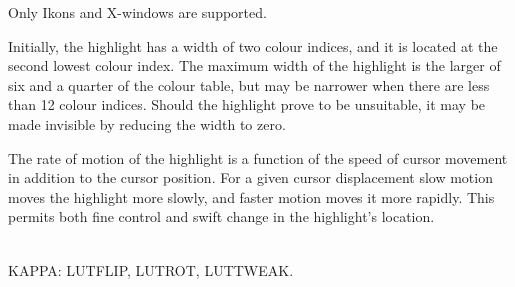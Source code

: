 \documentclass[twoside,11pt]{article}
\newcommand{\sstdiytopic}[2]{\goodbreak \item[{\hspace{-0.35em}#1\hspace{-0.35em}:}] \mbox{} \\[1.3ex] #2}
\newcommand{\sstitem}{\item}
\newcommand{\sstdiytopic}[2]{\item[{#1}]
      \begin{description}
         #2
      \end{description}
   }
\begin{document}
{{{         \sstitem
         Only Ikons and X-windows are supported.

         \sstitem
         Initially, the highlight has a width of two colour indices,
         and it is located at the second lowest colour index.  The maximum
         width of the highlight is the larger of six and a quarter of the
         colour table, but may be narrower when there are less than 12
         colour indices.  Should the highlight prove to be unsuitable, it
         may be made invisible by reducing the width to zero.

         \sstitem
         The rate of motion of the highlight is a function of the
         speed of cursor movement in addition to the cursor position.
         For a given cursor displacement slow motion moves the highlight
         more slowly, and faster motion moves it more rapidly.  This
         permits both fine control and swift change in the highlight's
         location.
      }
   }
   \sstdiytopic{
      Related Applications
   }{
      KAPPA: LUTFLIP, LUTROT, LUTTWEAK.
   }
}
\end{document}
